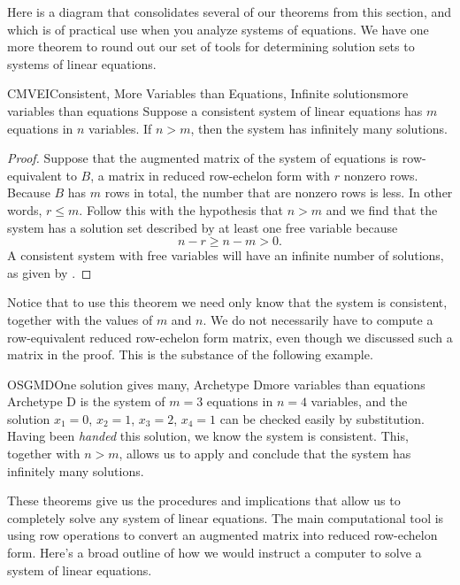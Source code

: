 %
Here is a diagram that consolidates several of our theorems from this section, and which is of practical use when you analyze systems of equations.
%
%
We have one more theorem to round out our set of tools for determining solution sets to systems of linear equations.
%
\begin{theorem}{CMVEI}{Consistent, More Variables than Equations, Infinite solutions}{more variables than equations}
Suppose a consistent system of linear equations has $m$ equations in $n$ variables.  If $n>m$, then the system has infinitely many solutions.
\end{theorem}
%
\begin{proof}
Suppose that the augmented matrix of the system of equations is row-equivalent to $B$, a matrix in reduced row-echelon form with $r$ nonzero rows.
Because $B$ has $m$ rows in total, the number that are nonzero rows is less.  In other words, $r\leq m$.
Follow this with the hypothesis that $n>m$ and we find that the system has a solution set described by at least one free variable because
%
\begin{equation*}
n-r\geq n-m>0.
\end{equation*}
%
A consistent system with free variables will have an infinite number of solutions, as given by .
\end{proof}
%
Notice that to use this theorem we need only know that the system is consistent, together with the values of $m$ and $n$.  We do not necessarily have to compute a row-equivalent reduced row-echelon form matrix, even though we discussed such a matrix in the proof.  This is the substance of the following example.
%
\begin{example}{OSGMD}{One solution gives many, Archetype D}{more variables than equations}
Archetype D is the system of $m=3$ equations in $n=4$ variables,
%
%
and the solution $x_1 = 0$, $x_2 = 1$, $x_3 = 2$, $x_4 = 1$ can be checked easily by substitution.  Having been {\em handed} this solution, we know the system is consistent.  This, together with $n>m$, allows us to apply  and conclude that the system has infinitely many solutions.
\end{example}
%
These theorems give us the procedures and implications that allow us to completely solve any system of linear equations.  The main computational tool is using row operations to convert an augmented matrix into reduced row-echelon form.  Here's a broad outline of how we would instruct a computer to solve  a system of linear equations.
